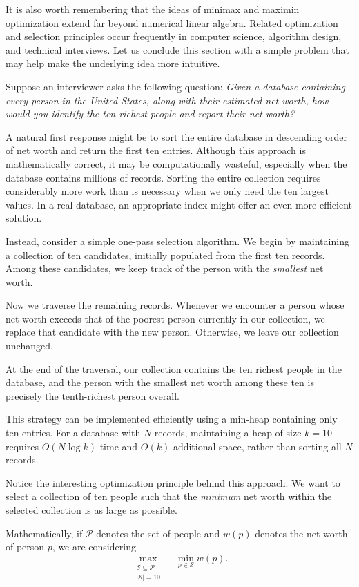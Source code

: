 \documentclass[14pt,letterpaper]{article}
\theoremstyle{plain}
\theoremstyle{definition}
\theoremstyle{remark}
\begin{document}
It is also worth remembering that the ideas
of minimax and maximin optimization extend far
beyond numerical linear algebra. Related
optimization and selection principles occur
frequently in computer science, algorithm design,
and technical interviews. Let us conclude this
section with a simple problem that may help
make the underlying idea more intuitive.

Suppose an interviewer asks the following question:
\emph{Given a database containing every person
in the United States, along with their estimated
net worth, how would you identify the ten richest
people and report their net worth?}

A natural first response might be to sort the
entire database in descending order of net worth
and return the first ten entries. Although this
approach is mathematically correct, it may be
computationally wasteful, especially when the
database contains millions of records. Sorting
the entire collection requires considerably
more work than is necessary when we only need
the ten largest values. In a real database,
an appropriate index might offer an even
more efficient solution.

Instead, consider a simple one-pass selection
algorithm. We begin by maintaining a collection
of ten candidates, initially populated from
the first ten records. Among these candidates,
we keep track of the person with the
\emph{smallest} net worth.

Now we traverse the remaining records.
Whenever we encounter a person whose net
worth exceeds that of the poorest person
currently in our collection, we replace
that candidate with the new person.
Otherwise, we leave our collection unchanged.

At the end of the traversal, our collection
contains the ten richest people in the
database, and the person with the smallest
net worth among these ten is precisely
the tenth-richest person overall.

This strategy can be implemented efficiently
using a min-heap containing only ten entries.
For a database with $N$ records, maintaining
a heap of size $k=10$ requires
$O(N\log k)$ time and $O(k)$ additional space,
rather than sorting all $N$ records.

Notice the interesting optimization principle
behind this approach. We want to select a
collection of ten people such that the
\emph{minimum} net worth within the selected
collection is as large as possible.

Mathematically, if $\mathcal P$ denotes the
set of people and $w(p)$ denotes the net
worth of person $p$, we are considering
\[
\boxed{
\max_{\substack{\mathcal S\subseteq\mathcal P\\
|\mathcal S|=10}}
\quad
\min_{p\in\mathcal S}w(p).
}
\]
\end{document}
